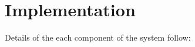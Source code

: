 \documentclass[11pt,twocolumn]{article}
\begin{document}

\section{Implementation}
Details of the each component of the system follow:
\end{document}
